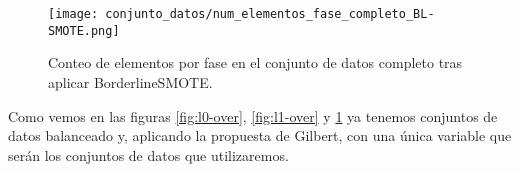 \begin{figure}[H]
    \centering
     \texttt{[image: conjunto\_datos/num\_elementos\_fase\_completo\_BL-SMOTE.png]}
    \caption{Conteo de elementos por fase en el conjunto de datos completo tras aplicar BorderlineSMOTE.}
	 \label{fig:completo-over}
\end{figure}


Como vemos en las figuras \ref{fig:l0-over}, \ref{fig:l1-over} y \ref{fig:completo-over} ya tenemos conjuntos de datos balanceado y, aplicando la propuesta de Gilbert, con una única variable que serán los conjuntos de datos que utilizaremos.

